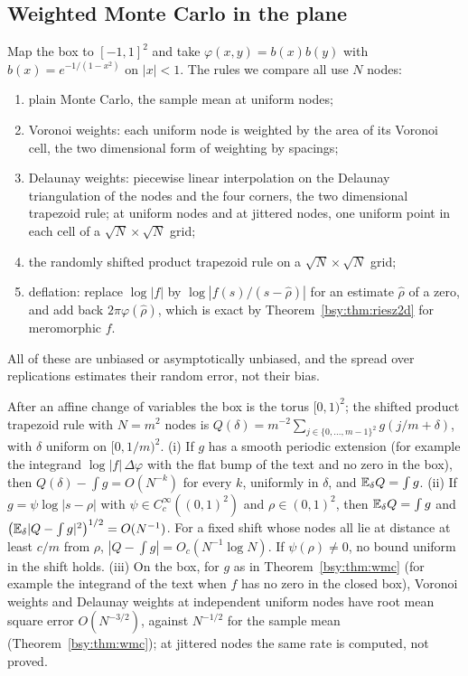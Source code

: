 \subsection{Weighted Monte Carlo in the plane}

Map the box to $[-1,1]^2$ and take $\varphi(x,y)=b(x)b(y)$ with $b(x)=e^{-1/(1-x^2)}$ on $|x|<1$. The rules we compare all use $N$ nodes:
\begin{enumerate}\setlength{\itemsep}{1pt}
\item plain Monte Carlo, the sample mean at uniform nodes;
\item Voronoi weights: each uniform node is weighted by the area of its Voronoi cell, the two dimensional form of weighting by spacings;
\item Delaunay weights: piecewise linear interpolation on the Delaunay triangulation of the nodes and the four corners, the two dimensional trapezoid rule; at uniform nodes and at jittered nodes, one uniform point in each cell of a $\sqrt N\times\sqrt N$ grid;
\item the randomly shifted product trapezoid rule on a $\sqrt N\times\sqrt N$ grid;
\item deflation: replace $\log|f|$ by $\log|f(s)/(s-\hat\rho)|$ for an estimate $\hat\rho$ of a zero, and add back $2\pi\varphi(\hat\rho)$, which is exact by Theorem~\ref{bsy:thm:riesz2d} for meromorphic $f$.
\end{enumerate}
All of these are unbiased or asymptotically unbiased, and the spread over replications estimates their random error, not their bias.

\begin{proposition}[rates]\label{bsy:prop:rates2d}
After an affine change of variables the box is the torus $[0,1)^2$; the shifted product trapezoid rule with $N=m^2$ nodes is $Q(\delta)=m^{-2}\sum_{j\in\{0,\dots,m-1\}^2}g(j/m+\delta)$, with $\delta$ uniform on $[0,1/m)^2$.
(i) If $g$ has a smooth periodic extension (for example the integrand $\log|f|\,\Delta\varphi$ with the flat bump of the text and no zero in the box), then $Q(\delta)-\int g=O(N^{-k})$ for every $k$, uniformly in $\delta$, and $\mathbb{E}_\delta Q=\int g$.
(ii) If $g=\psi\log|s-\rho|$ with $\psi\in C_c^\infty((0,1)^2)$ and $\rho\in(0,1)^2$, then $\mathbb{E}_\delta Q=\int g$ and $\bigl(\mathbb{E}_\delta|Q-\int g|^2\bigr)^{1/2}=O(N^{-1})$. For a fixed shift whose nodes all lie at distance at least $c/m$ from $\rho$, $|Q-\int g|=O_c(N^{-1}\log N)$. If $\psi(\rho)\ne0$, no bound uniform in the shift holds.
(iii) On the box, for $g$ as in Theorem~\ref{bsy:thm:wmc} (for example the integrand of the text when $f$ has no zero in the closed box), Voronoi weights and Delaunay weights at independent uniform nodes have root mean square error $O(N^{-3/2})$, against $N^{-1/2}$ for the sample mean (Theorem~\ref{bsy:thm:wmc}); at jittered nodes the same rate is computed, not proved.
\end{proposition}


